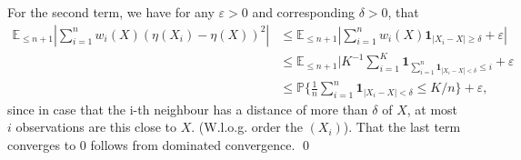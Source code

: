 \documentclass[a4paper,11pt]{article} %
\numberwithin{equation}{section}
\renewenvironment{proof}
  {{\noindent \itshape \color{gruvblue} Proof. }}{\color{gruvblue}\qed}
\theoremstyle{ndefinition}
\theoremstyle{nremark}
\theoremstyle{nplain}
\begin{document}
\begin{proof}
  For the second term, we have for any \( \varepsilon > 0 \) and corresponding
  \( \delta > 0 \), that 
  \begin{align*}
    \mathbb{E}_{\le n + 1} | 
      \sum_{i = 1}^{n} w_{i}(X) ( \eta(X_{i}) - \eta(X) )^{2} 
    | 
    & \le \mathbb{E}_{\le n + 1} | 
            \sum_{i = 1}^{n} w_{i}(X) \mathbf{1}_{| X_{i} - X | \ge \delta} 
            + \varepsilon
          | 
    \\ 
    & \le \mathbb{E}_{\le n + 1} | 
          K^{-1} \sum_{i = 1}^{K} 
          \mathbf{1}_{
            \sum_{i = 1}^{n} \mathbf{1}_{| X_{i} - X | < \delta}  \le i
          }  
          + \varepsilon 
    \\ 
    & \le \mathbb{P} \Big\{ 
            \frac{1}{n} \sum_{i = 1}^{n} \mathbf{1}_{| X_{i} - X | < \delta} 
            \le K / n
          \Big\} 
          + \varepsilon, 
  \end{align*}
  since in case that the i-th neighbour has a distance of more than \( \delta \)
  of \( X \), at most \( i \) observations are this close to \( X \). (W.l.o.g.
  order the \( ( X_{i} ) \)). That the last term converges to \( 0 \) follows
  from dominated convergence.
\end{proof}%


% 
% 
\end{document}
